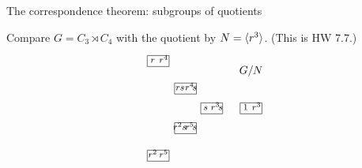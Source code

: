 \documentclass[8pt]{beamer}
\begin{document}
\begin{frame}{The correspondence theorem: subgroups of quotients}
  
  Compare $G=C_3 \rtimes C_4$ with the quotient by $N=\langle r^3\rangle$. (This is HW 7.7.)
  \[
  \begin{tikzpicture}[scale=.7,baseline=1.3ex,auto]
    \tikzstyle{every node}=[font=\footnotesize]
    \node at (2.5,1.95) {\normalsize $G/N$};
    \begin{scope}[shift={(.2,0)},scale=1]
      \draw (0,0) rectangle (1,.5);
      \node[anchor=south] at (.22,0) {$s$};
      \draw[anchor=south] (.73,0) node{$r^3\!s$};
      \node (123-b) at (1,.25) {};
      \node (123-out) at (.55,0) {}; \node (123-in) at (.55,.5) {};
    \end{scope}
    \begin{scope}[shift={(-1,-.9)}]  %
      \draw (0,0) rectangle (1,.5);
      \node[anchor=south] at (.24,0) {$r^2s$};
      \draw[anchor=south] (.75,0) node{$r^5\!s$};
      \node (231-b) at (.2,0) {};
      \node (231-in) at (1,.25) {}; \node (231-out) at (0,.5) {};
    \end{scope}
    \begin{scope}[shift={(-1,.9)}]
      \draw (0,0) rectangle (1,.5);
      \node[anchor=south] at (.25,0) {$rs$};
      \draw[anchor=south] (.75,0) node{$r^4\!s$};
      \node (312-b) at (.2,.5) {};
      \node (312-in) at (0,0) {}; \node (312-out) at (1,.25) {};
    \end{scope}
    \begin{scope}[shift={(2,0)}]
      \draw (0,0) rectangle (1,.5);
      \node[anchor=south] at (.25,0) {$1$};
      \draw[anchor=south] (.75,0) node{$r^3$};
      \node (132-b) at (0,.25) {};
      \node (132-in) at (0,0) {}; \node (132-out) at (0,.5) {};
    \end{scope}
    \begin{scope}[shift={(-2.25,-2.15)}]
      \draw (0,0) rectangle (1,.5);
      \node[anchor=south] at (.25,0) {$r^2$};
      \draw[anchor=south] (.75,0) node{$r^5$};
      \node (213-b) at (.8,.5) {};
      \node (213-in) at (.3,.5) {}; \node (213-out) at (1,.25) {};
    \end{scope}
    \begin{scope}[shift={(-2.25,2.15)}]
      \draw (0,0) rectangle (1,.5);
      \node[anchor=south] at (.25,0) {$r$};
      \draw[anchor=south] (.75,0) node{$r^4$};
      \node (321-b) at (.8,0) {};
      \node (321-in) at (1,.25) {}; \node (321-out) at (.3,0) {};

\end{scope}
\end{tikzpicture}\]
\end{frame}
\end{document}
